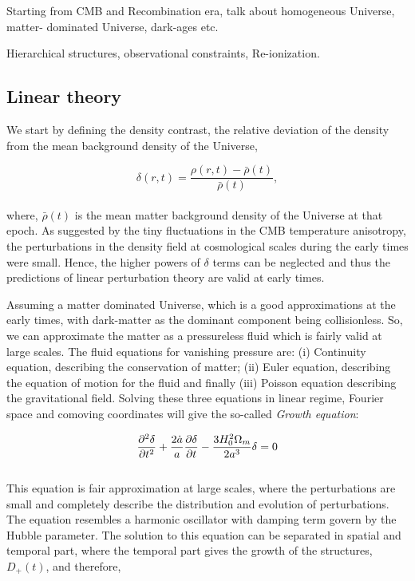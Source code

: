 Starting from CMB and Recombination era, talk about homogeneous Universe, matter-
dominated Universe, dark-ages etc.

Hierarchical structures, observational constraints, Re-ionization.

\subsection{Linear theory}


We start by defining the density contrast, the relative deviation of the density
from the mean background density of the Universe,

\begin{equation}
	\delta(r,t) = \dfrac{\rho(r,t) - \bar{\rho}(t)}{\bar{\rho}(t)},
\end{equation}
\\
where, $\bar{\rho}(t)$ is the mean matter background density 
of the Universe at that epoch. 
As suggested by the tiny fluctuations in the CMB temperature anisotropy, 
the perturbations in the density field at cosmological scales during 
the early times were small. Hence, the higher powers of $\delta$ terms
can be neglected and thus the predictions of linear perturbation theory
are valid at early times.

Assuming a matter dominated Universe, which is a good approximations at the
early times, with dark-matter as the dominant component being collisionless. 
So, we can approximate the matter as a pressureless fluid which is fairly 
valid at large scales. The fluid equations for vanishing pressure are: 
(i) Continuity equation, describing the conservation of matter; (ii) Euler
equation, describing the equation of motion for the fluid and finally (iii) 
Poisson equation describing the gravitational field. Solving these three 
equations in linear regime, Fourier space and comoving coordinates will give
the so-called {\it Growth equation}:

\begin{equation}
\centering
\dfrac{\partial^2\delta}{\partial t^2} + \dfrac{2\dot{a}}{a} 
		\dfrac{\partial\delta}{\partial t}
		- \dfrac{3H_0^2 \Omega_m}{2a^3} \delta = 0
\end{equation}
\\
This equation is fair approximation at large scales, where the perturbations
are small and completely describe the distribution and evolution of perturbations. 
The equation resembles a harmonic oscillator with damping
term govern by the Hubble parameter. The solution to this equation can be 
separated in spatial and temporal part, where the temporal part gives the 
growth of the structures, $D_+(t)$, and therefore,

